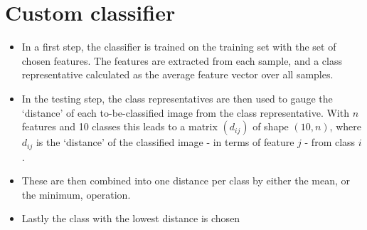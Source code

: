 \documentclass[a4paper]{scrreprt}
\newcommand{\var}[1]{\textit{#1}}
\newcommand{\op}[1]{\textsl{#1}}
\begin{document}

\section{Custom classifier}

\begin{itemize}
		\item In a first step, the classifier is trained on the training set
				with the set of chosen features. The features are extracted
				from each sample, and a class representative calculated as the
				average feature vector over all samples.

		\item In the testing step, the class representatives are then used to
				gauge the `distance' of each to-be-classified image from the
				class representative. With $n$ features and 10 classes this
				leads to a matrix $(d_{ij})$ of shape $(10, n)$, where $d_{ij}$
				is the `distance' of the classified image - in terms of feature
				$j$ - from class $i$.

		\item These are then combined into one distance per class by either the
				mean, or the minimum, operation.

		\item Lastly the class with the lowest distance is chosen
\end{itemize}
\end{document}
